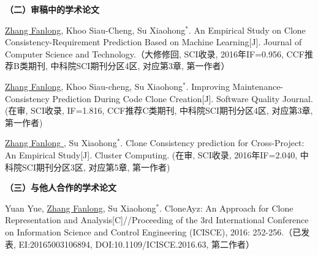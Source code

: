 \noindent\textbf{（二）审稿中的学术论文}
\begin{publist}

\item
\underline{Zhang Fanlong},  Khoo Siau-Cheng, Su Xiaohong{$^*$}. An Empirical Study on Clone Consistency-Requirement Prediction Based on Machine Learning[J]. Journal of Computer Science and Technology.（大修修回, SCI收录, 2016年IF=0.956, CCF推荐B类期刊, 中科院SCI期刊分区4区, 对应第3章, 第一作者）

\item
\underline{Zhang Fanlong}, Khoo Siau-cheng, Su Xiaohong{$^*$}. Improving Maintenance-Consistency Prediction During Code Clone Creation[J]. Software Quality Journal. (在审, SCI收录, IF=1.816, CCF推荐C类期刊, 中科院SCI期刊分区4区, 对应第3章, 第一作者) 

\item
\underline{Zhang Fanlong }, Su Xiaohong{$^*$}. Clone Consistency prediction for Cross-Project: An Empirical Study[J]. Cluster Computing. (在审, SCI收录, 2016年IF=2.040, 中科院SCI期刊分区3区, 对应第5章, 第一作者)



\end{publist}

\noindent\textbf{（三）与他人合作的学术论文}
\begin{publist}
\item
Yuan Yue, \underline{Zhang Fanlong},  Su Xiaohong{$^*$}. CloneAyz: An Approach for Clone Representation and Analysis[C]//Proceeding of the 3rd International Conference on Information Science and Control Engineering (ICISCE), 2016: 252-256.（已发表, EI:20165003106894, DOI:10.1109/ICISCE.2016.63, 第二作者）
\end{publist}




